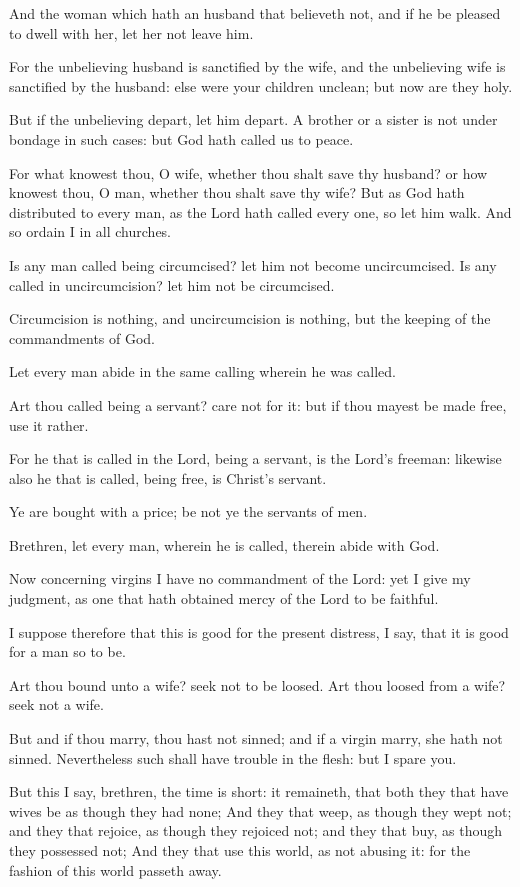 \verse And the woman which hath an husband that believeth not, and if he be pleased to dwell with her, let her not leave him.

\verse For the unbelieving husband is sanctified by the wife, and the unbelieving wife is sanctified by the husband: else were your children unclean; but now are they holy.

\verse But if the unbelieving depart, let him depart. A brother or a sister is not under bondage in such cases: but God hath called us to peace.

\verse For what knowest thou, O wife, whether thou shalt save thy husband?  or how knowest thou, O man, whether thou shalt save thy wife?  \verse But as God hath distributed to every man, as the Lord hath called every one, so let him walk. And so ordain I in all churches.

\verse Is any man called being circumcised? let him not become uncircumcised. Is any called in uncircumcision? let him not be circumcised.

\verse Circumcision is nothing, and uncircumcision is nothing, but the keeping of the commandments of God.

\verse Let every man abide in the same calling wherein he was called.

\verse Art thou called being a servant? care not for it: but if thou mayest be made free, use it rather.

\verse For he that is called in the Lord, being a servant, is the Lord's freeman: likewise also he that is called, being free, is Christ's servant.

\verse Ye are bought with a price; be not ye the servants of men.

\verse Brethren, let every man, wherein he is called, therein abide with God.

\verse Now concerning virgins I have no commandment of the Lord: yet I give my judgment, as one that hath obtained mercy of the Lord to be faithful.

\verse I suppose therefore that this is good for the present distress, I say, that it is good for a man so to be.

\verse Art thou bound unto a wife? seek not to be loosed. Art thou loosed from a wife? seek not a wife.

\verse But and if thou marry, thou hast not sinned; and if a virgin marry, she hath not sinned. Nevertheless such shall have trouble in the flesh: but I spare you.

\verse But this I say, brethren, the time is short: it remaineth, that both they that have wives be as though they had none; \verse And they that weep, as though they wept not; and they that rejoice, as though they rejoiced not; and they that buy, as though they possessed not; \verse And they that use this world, as not abusing it: for the fashion of this world passeth away.

